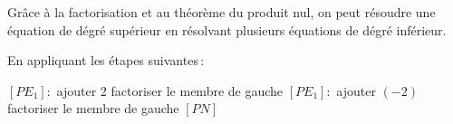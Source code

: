 \documentclass[a4paper,12pt]{report}
\begin{document}
\begin{boiteExT}
	\vspace{10cm}	

\end{boiteExT}

Grâce à la factorisation et au théorème du produit nul, on peut résoudre une équation de dégré supérieur en résolvant plusieurs équations de dégré inférieur.

\begin{boiteExT}[Résoudre $x^3(x+2)^2=x^2(x+2)^2$]
	\vspace{10cm}

\end{boiteExT}

\begin{boiteExT}[Résoudre $x^2+2x-1=0$]
	En appliquant les étapes suivantes\,:

	\begin{tasks}
\task $\left[P E_1\right]:$ ajouter 2
\vspace{1.5cm}
\task factoriser le membre de gauche
\vspace{1.5cm}
\task $\left[P E_1\right]:$ ajouter $(-2)$
\vspace{1.5cm}
\task factoriser le membre de gauche
\vspace{1.5cm}
\task $\left[P N\right]$
\vspace{1.5cm}
	\end{tasks}
\end{boiteExT}

\begin{boiteExT}[Résoudre $(8x+1)^2-(2x-3)^2=0$]
	\vspace{11cm}	
\end{boiteExT}
\end{document}
